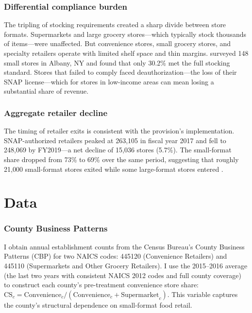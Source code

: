 \documentclass[12pt]{article}
\begin{document}
\subsubsection*{Differential compliance burden} The tripling of stocking requirements created a sharp divide between store formats. Supermarkets and large grocery stores---which typically stock thousands of items---were unaffected. But convenience stores, small grocery stores, and specialty retailers operate with limited shelf space and thin margins. \citet{andreyeva2019dietary} surveyed 148 small stores in Albany, NY and found that only 30.2\% met the full stocking standard. Stores that failed to comply faced deauthorization---the loss of their SNAP license---which for stores in low-income areas can mean losing a substantial share of revenue.

\subsubsection*{Aggregate retailer decline} The timing of retailer exits is consistent with the provision's implementation. SNAP-authorized retailers peaked at 263,105 in fiscal year 2017 and fell to 248,069 by FY2019---a net decline of 15,036 stores (5.7\%). The small-format share dropped from 73\% to 69\% over the same period, suggesting that roughly 21,000 small-format stores exited while some large-format stores entered \citep{usda_fns_annual}.


\section{Data}
\label{sec:data}

\subsubsection*{County Business Patterns} I obtain annual establishment counts from the Census Bureau's County Business Patterns (CBP) for two NAICS codes: 445120 (Convenience Retailers) and 445110 (Supermarkets and Other Grocery Retailers). I use the 2015--2016 average (the last two years with consistent NAICS 2012 codes and full county coverage) to construct each county's pre-treatment convenience store share: $\text{CS}_{c} = \text{Convenience}_{c} / (\text{Convenience}_{c} + \text{Supermarket}_{c})$. This variable captures the county's structural dependence on small-format food retail.
\end{document}
